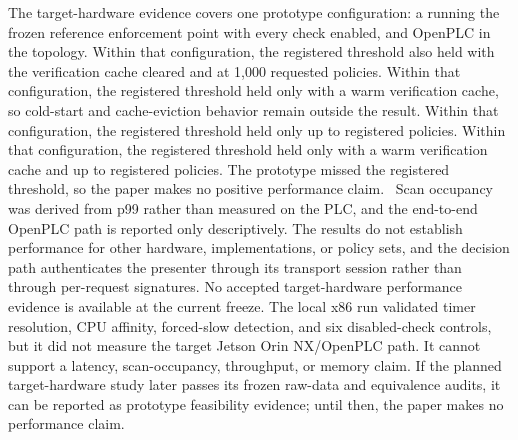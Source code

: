 \ifzonecaphardware
The target-hardware evidence covers one prototype configuration: a  running the frozen reference enforcement point with every check enabled, and OpenPLC in the  topology. \ifcase\cfiveoutcomecase
Within that configuration, the registered threshold also held with the verification cache cleared and at 1,000 requested policies.
\or
Within that configuration, the registered threshold held only with a warm verification cache, so cold-start and cache-eviction behavior remain outside the result.
\or
Within that configuration, the registered threshold held only up to  registered policies.
\or
Within that configuration, the registered threshold held only with a warm verification cache and up to  registered policies.
\or
The prototype missed the registered threshold, so the paper makes no positive performance claim.
\fi\ Scan occupancy was derived from p99 rather than measured on the PLC, and the end-to-end OpenPLC path is reported only descriptively. The results do not establish performance for other hardware, implementations, or policy sets, and the decision path authenticates the presenter through its transport session rather than through per-request signatures.
\else
No accepted target-hardware performance evidence is available at the current freeze. The local x86 run validated timer resolution, CPU affinity, forced-slow detection, and six disabled-check controls, but it did not measure the target Jetson Orin NX/OpenPLC path. It cannot support a latency, scan-occupancy, throughput, or memory claim. If the planned target-hardware study later passes its frozen raw-data and equivalence audits, it can be reported as prototype feasibility evidence; until then, the paper makes no performance claim.
\fi
